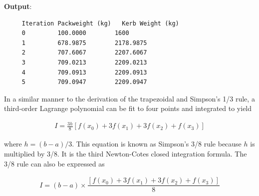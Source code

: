 \documentclass[book.tex]{subfiles}
\begin{document}
\begin{example}
%
%  
%
%
%
%
\begin{marginfigure}[-25\baselineskip]
	\textbf{Output}:
	\begin{verbatim}
	 Iteration Packweight (kg)   Kerb Weight (kg)
     0         100.0000        1600
     1         678.9875        2178.9875
     2         707.6067        2207.6067
     3         709.0213        2209.0213
     4         709.0913        2209.0913
     5         709.0947        2209.0947
	\end{verbatim}
\end{marginfigure}
\end{example}

In a similar manner to the derivation of the trapezoidal and Simpson's 1/3 rule, a third-order Lagrange polynomial can be fit to four points and integrated to yield

\begin{align}
I = \frac{3h}{8}[f(x_0) + 3f(x_1) + 3f(x_2) + f(x_3)]
\end{align}

where $h = (b-a)/3$. This equation is known as Simpson's 3/8 rule because $h$ is multiplied by 3/8. It is the third Newton-Cotes closed integration formula. The 3/8 rule can also be expressed as

\begin{align}
I = (b-a) \times \dfrac{[f(x_0) + 3f(x_1) + 3f(x_2) + f(x_3)]}{8}
\end{align}
\end{document}
